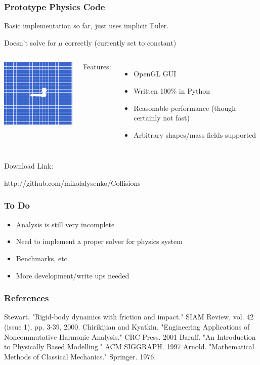 \documentclass{beamer}
\begin{document}
\begin{frame}
\frametitle{Prototype Physics Code}

Basic implementation so far, just uses implicit Euler.

\hskip10pt Doesn't solve for $\mu$ correctly (currently set to constant)

\vskip15pt
\begin{columns}

		\begin{center}
		\includegraphics[width=1.8in]{figures/screenshot.png}
		\end{center}
		
		Features:
		\begin{itemize}
			\item OpenGL GUI
			\item Written 100\% in Python
			\item Reasonable performance (though certainly not fast)
			\item Arbitrary shapes/mass fields supported
		\end{itemize}
\end{columns}

\vskip15pt
Download Link:
\begin{center}
http://github.com/mikolalysenko/Collisions
\end{center}
\end{frame}

\begin{frame}
\frametitle{To Do}
\begin{itemize}
\item Analysis is still very incomplete
\item Need to implement a proper solver for physics system
\item Benchmarks, etc.
\item More development/write ups needed
\end{itemize}
\end{frame}

\begin{frame}
\frametitle{References}
Stewart. "Rigid-body dynamics with friction and impact." SIAM Review, vol. 42 (issue 1), pp. 3-39, 2000.
\vskip10pt
Chirikijian and Kyatkin. "Engineering Applications of Noncommutative Harmonic Analysis." CRC Press.  2001
\vskip10pt
Baraff. "An Introduction to Physically Based Modelling." ACM SIGGRAPH. 1997
\vskip10pt
Arnold. "Mathematical Methods of Classical Mechanics." Springer. 1976.
\end{frame}
\end{document}

